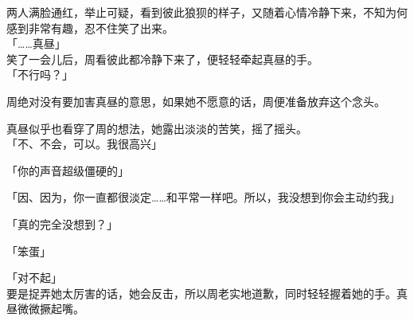 两人满脸通红，举止可疑，看到彼此狼狈的样子，又随着心情冷静下来，不知为何感到非常有趣，忍不住笑了出来。\\

「……真昼」\\

笑了一会儿后，周看彼此都冷静下来了，便轻轻牵起真昼的手。\\

「不行吗？」

周绝对没有要加害真昼的意思，如果她不愿意的话，周便准备放弃这个念头。

真昼似乎也看穿了周的想法，她露出淡淡的苦笑，摇了摇头。\\

「不、不会，可以。我很高兴」

「你的声音超级僵硬的」

「因、因为，你一直都很淡定……和平常一样吧。所以，我没想到你会主动约我」

「真的完全没想到？」

「笨蛋」

「对不起」\\

要是捉弄她太厉害的话，她会反击，所以周老实地道歉，同时轻轻握着她的手。真昼微微撅起嘴。\\

